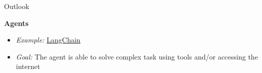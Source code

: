 \begin{vbframe}{Outlook}

\vfill

\textbf{Agents}

	\begin{itemize}
		\item \textit{Example:} \href{https://python.langchain.com/docs/get_started/introduction.html}{LangChain}
		\item \textit{Goal:} The agent is able to solve complex task using tools and/or accessing the internet 
	\end{itemize}
	
\vfill

\end{vbframe}


\endlecture
